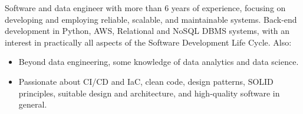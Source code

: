 
\begin{cvparagraph}

Software and data engineer with more than 6 years of experience, focusing on developing and employing reliable, scalable, and maintainable systems. Back-end development in Python, AWS, Relational and NoSQL DBMS systems, with an interest in practically all aspects of the Software Development Life Cycle. Also:

\begin{itemize}
    
    \item Beyond data engineering, some knowledge of data analytics and data science.

    \item Passionate about CI/CD and IaC, clean code, design patterns, SOLID principles, suitable design and architecture, and high-quality software in general.

\end{itemize}
\end{cvparagraph}
